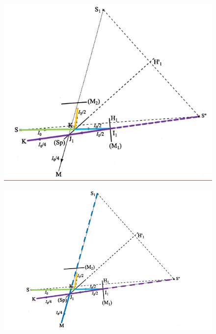 \documentclass[10pt]{beamer}
\begin{document}
\begin{frame}{\insertsubsection}
    \begin{figure}
        \centering
        \includegraphics[width=1\textwidth]{M3.png}
    \end{figure}
\end{frame}
\begin{frame}{\insertsubsection}
    \begin{figure}
        \centering
        \includegraphics[width=1\textwidth]{M4.png}
    \end{figure}
\end{frame}
\end{document}
